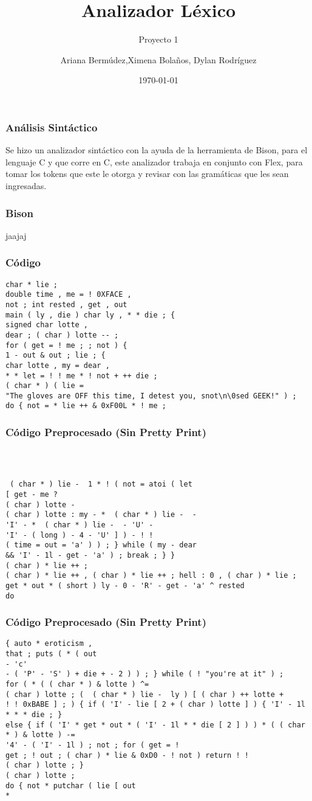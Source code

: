 \documentclass{beamer}
\title{Analizador L\'exico}
\subtitle{Proyecto 1}
\author{Ariana Berm\'udez,Ximena Bola\~nos, Dylan Rodr\'iguez}
\institute{Instituto Tecnol\'ogico de Costa Rica}
\date{\today}
\begin{document}
\begin{frame}
 \titlepage 
 \end{frame}\begin{frame}
 \frametitle{An\'alisis Sint\'actico}
  Se hizo un analizador sint\'actico con la ayuda de la herramienta de Bison, para el lenguaje C y que corre en C, este analizador trabaja en conjunto con Flex, para tomar los tokens que este le otorga y revisar con las gram\'aticas que les sean ingresadas.\end{frame}\begin{frame}
 \frametitle{Bison}
 jaajaj\end{frame}\begin{frame}[fragile]
\frametitle{C\'odigo}
\begin{lstlisting}[style=CStyle]
char * lie ; 
double time , me = ! 0XFACE , 
not ; int rested , get , out 
main ( ly , die ) char ly , * * die ; { 
signed char lotte , 
dear ; ( char ) lotte -- ; 
for ( get = ! me ; ; not ) { 
1 - out & out ; lie ; { 
char lotte , my = dear , 
* * let = ! ! me * ! not + ++ die ; 
( char * ) ( lie = 
"The gloves are OFF this time, I detest you, snot\n\0sed GEEK!" ) ; 
do { not = * lie ++ & 0xF00L * ! me ; 
\end{lstlisting}
\end{frame}
\begin{frame}[fragile]
\frametitle{C\'odigo Preprocesado (Sin Pretty Print)}
\begin{lstlisting}[style=CStyle]


 
 ( char * ) lie -  1 * ! ( not = atoi ( let 
[ get - me ? 
( char ) lotte - 
( char ) lotte : my - *  ( char * ) lie -  - 
'I' - *  ( char * ) lie -  - 'U' - 
'I' - ( long ) - 4 - 'U' ] ) - ! ! 
( time = out = 'a' ) ) ; } while ( my - dear 
&& 'I' - 1l - get - 'a' ) ; break ; } } 
( char ) * lie ++ ; 
( char ) * lie ++ , ( char ) * lie ++ ; hell : 0 , ( char ) * lie ; 
get * out * ( short ) ly - 0 - 'R' - get - 'a' ^ rested 
do \end{lstlisting}
\end{frame}
\begin{frame}[fragile]
\frametitle{C\'odigo Preprocesado (Sin Pretty Print)}
\begin{lstlisting}[style=CStyle]
{ auto * eroticism , 
that ; puts ( * ( out 
- 'c' 
- ( 'P' - 'S' ) + die + - 2 ) ) ; } while ( ! "you're at it" ) ; 
for ( * ( ( char * ) & lotte ) ^= 
( char ) lotte ; (  ( char * ) lie -  ly ) [ ( char ) ++ lotte + 
! ! 0xBABE ] ; ) { if ( 'I' - lie [ 2 + ( char ) lotte ] ) { 'I' - 1l * * * die ; } 
else { if ( 'I' * get * out * ( 'I' - 1l * * die [ 2 ] ) ) * ( ( char * ) & lotte ) -= 
'4' - ( 'I' - 1l ) ; not ; for ( get = ! 
get ; ! out ; ( char ) * lie & 0xD0 - ! not ) return ! ! 
( char ) lotte ; } 
( char ) lotte ; 
do { not * putchar ( lie [ out 
* \end{lstlisting}
\end{frame}
\end{document}
